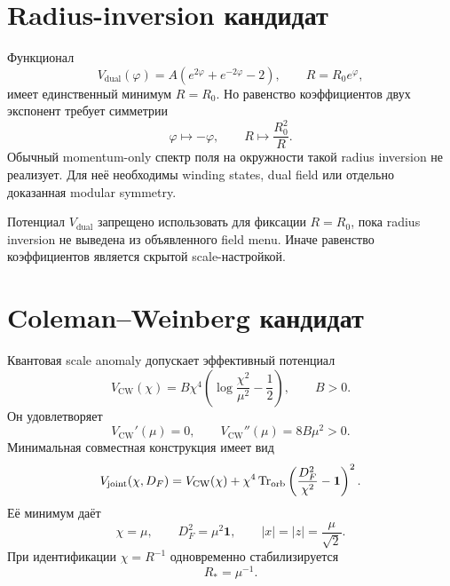 \section{Radius-inversion кандидат}

Функционал
\begin{equation}
 V_{\mathrm{dual}}(\varphi)
 =A\left(e^{2\varphi}+e^{-2\varphi}-2\right),
 \qquad
 R=R_0e^\varphi,
\end{equation}
имеет единственный минимум \(R=R_0\). Но равенство коэффициентов двух
экспонент требует симметрии
\begin{equation}
 \varphi\longmapsto-\varphi,
 \qquad
 R\longmapsto\frac{R_0^2}{R}.
\end{equation}
Обычный momentum-only спектр поля на окружности такой radius inversion не
реализует. Для неё необходимы winding states, dual field или отдельно
доказанная modular symmetry.

\begin{nogocriterion}
Потенциал \(V_{\mathrm{dual}}\) запрещено использовать для фиксации
\(R=R_0\), пока radius inversion не выведена из объявленного field menu.
Иначе равенство коэффициентов является скрытой scale-настройкой.
\end{nogocriterion}

\section{Coleman--Weinberg кандидат}

Квантовая scale anomaly допускает эффективный потенциал
\begin{equation}
 V_{\mathrm{CW}}(\chi)
 =B\chi^4
 \left(
 \log\frac{\chi^2}{\mu^2}-\frac12
 \right),
 \qquad B>0.
\end{equation}
Он удовлетворяет
\begin{equation}
 V_{\mathrm{CW}}'(\mu)=0,
 \qquad
 V_{\mathrm{CW}}''(\mu)=8B\mu^2>0.
\end{equation}
Минимальная совместная конструкция имеет вид
\begin{equation}
 V_{\mathrm{joint}}(\chi,D_F)
 =
 V_{\mathrm{CW}}(\chi)
 +\chi^4\operatorname{Tr}_{\mathrm{orb}}
 \left(
 \frac{D_F^2}{\chi^2}-\mathbf1
 \right)^2.
\end{equation}
Её минимум даёт
\begin{equation}
 \chi=\mu,
 \qquad
 D_F^2=\mu^2\mathbf1,
 \qquad
 |x|=|z|=\frac{\mu}{\sqrt2}.
\end{equation}
При идентификации \(\chi=R^{-1}\) одновременно стабилизируется
\begin{equation}
 R_*=\mu^{-1}.
\end{equation}

